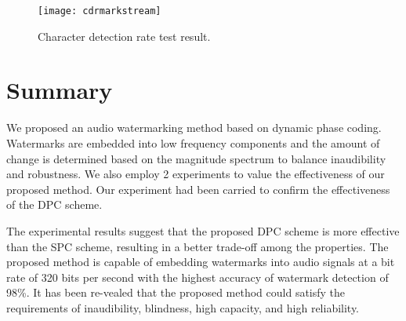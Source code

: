 \begin{figure}[h]
	\centering
\texttt{[image: cdrmarkstream]}
 	\caption{Character detection rate test result.}
 	\label{fig:CDRMarkstream}
\end{figure}

\section{Summary}
We proposed an audio watermarking method based on dynamic phase coding. Watermarks are embedded into low frequency components and the amount of change is determined based on the magnitude spectrum to balance inaudibility and robustness. We also employ 2 experiments to value the effectiveness of our proposed method. Our experiment had been carried to confirm the effectiveness of the DPC scheme.

The experimental results suggest that the proposed DPC scheme is more effective
than the SPC scheme, resulting in a better trade-off among the properties.
The proposed method is capable of embedding watermarks into audio signals at a
bit rate of 320 bits per second with the highest accuracy of watermark detection of 98\%. It has been re-vealed that the proposed method could satisfy the requirements of inaudibility, blindness, high capacity, and high reliability. 